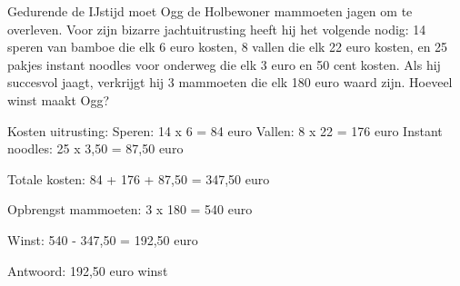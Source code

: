 \begin{opgave}
Gedurende de IJstijd moet Ogg de Holbewoner mammoeten jagen om te overleven. 
Voor zijn bizarre jachtuitrusting heeft hij het volgende nodig: 14 speren van 
bamboe die elk 6 euro kosten, 8 vallen die elk 22 euro kosten, en 25 pakjes 
instant noodles voor onderweg die elk 3 euro en 50 cent kosten. Als hij 
succesvol jaagt, verkrijgt hij 3 mammoeten die elk 180 euro waard zijn. 
Hoeveel winst maakt Ogg?
\end{opgave}

\begin{oplossing}
Kosten uitrusting:
Speren: 14 x 6 = 84 euro
Vallen: 8 x 22 = 176 euro
Instant noodles: 25 x 3,50 = 87,50 euro

Totale kosten:
84 + 176 + 87,50 = 347,50 euro

Opbrengst mammoeten:
3 x 180 = 540 euro

Winst:
540 - 347,50 = 192,50 euro

Antwoord: 192,50 euro winst
\end{oplossing}
